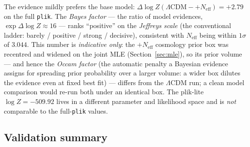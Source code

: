 \documentclass[11pt]{article}
\newcommand{\code}[1]{\texttt{\small #1}}
\newcommand{\Neff}{N_{\mathrm{eff}}}
\begin{document}
The evidence mildly prefers the base model:
$\Delta\log Z(\Lambda\mathrm{CDM}-{+}\Neff)=+2.79$ on the full \code{plik}.
The \emph{Bayes factor} --- the ratio of model evidences,
$\exp\Delta\log Z\approx16$ --- ranks ``positive'' on the \emph{Jeffreys
scale} (the conventional ladder: barely / positive / strong / decisive),
consistent with $\Neff$ being within $1\sigma$ of $3.044$. This number is
\emph{indicative only}: the $+\Neff$ cosmology prior box was recentred and
widened on the joint MLE (Section~\ref{sec:mle}), so its prior volume ---
and hence the \emph{Occam factor} (the automatic penalty a Bayesian
evidence assigns for spreading prior probability over a larger volume: a
wider box dilutes the evidence even at fixed best fit) --- differs from the
$\Lambda$CDM run; a clean model comparison would re-run both under an
identical box. The plik-lite
$\log Z=-509.92$ lives in a different parameter and likelihood space and is
\emph{not} comparable to the full-\code{plik} values.

\subsection{Validation summary}
\label{sec:validation}
\end{document}
